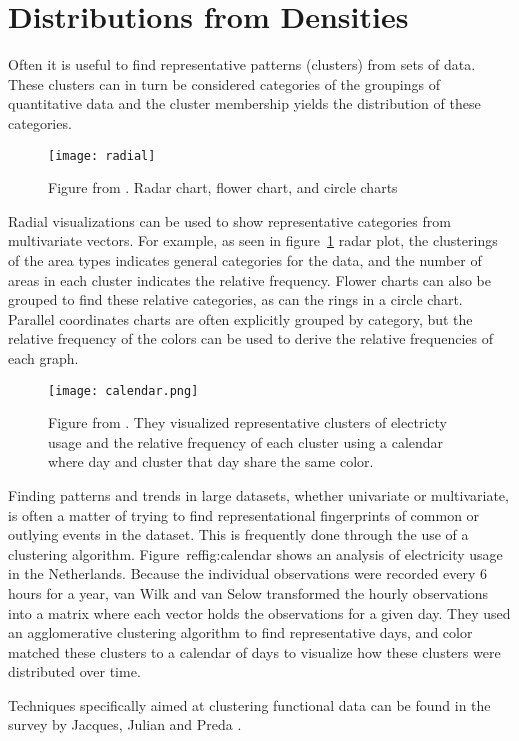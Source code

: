 \section{Distributions from Densities}  

Often it is useful to find representative patterns (clusters) from sets of data. These clusters can in turn be considered categories of the groupings of quantitative data and the cluster membership yields the distribution of these categories. 

\begin{figure}
\texttt{[image: radial]}
\caption{Figure from \cite{albo_off_2016}. Radar chart, flower chart, and circle
  charts}
\label{fig:radial}
\end{figure}
Radial visualizations can be used to show representative
categories from multivariate vectors. For example, as seen in figure~\ref{fig:radial}
radar plot, the clusterings of the area types indicates general categories for
the data, and the number of areas in each cluster indicates the relative
frequency. Flower charts can also be grouped to find these relative
categories, as can the rings in a circle chart. Parallel coordinates charts are often explicitly grouped by category, but the relative frequency of the colors can be used to derive the relative frequencies of each graph. 

\begin{figure}
\texttt{[image: calendar.png]}
\caption{Figure from \cite{van_wijk_cluster_1999}. They visualized representative clusters of electricty usage and the relative frequency of each cluster using a calendar where day and cluster that day share the same color.}
\label{fig:calendar}
\end{figure}

Finding patterns and trends in large datasets, whether univariate or multivariate, is often a matter of trying to find representational fingerprints of common or outlying events in the dataset. This is frequently done through the use of a clustering algorithm. Figure~ref{fig:calendar} shows an analysis of electricity usage in the Netherlands\cite{van_wijk_cluster_1999}. Because the individual observations were recorded every 6 hours for a year, van Wilk and van Selow transformed the hourly observations into a matrix where each vector holds the observations for a given day. They used an agglomerative clustering algorithm \cite{kaufman_agglomerative_1990} to find representative days, and color matched these clusters to a calendar of days to visualize how these clusters were distributed over time. 

Techniques specifically aimed at clustering functional data can be found in the survey by Jacques, Julian and Preda \cite{Jacques_functional_2014}. %
